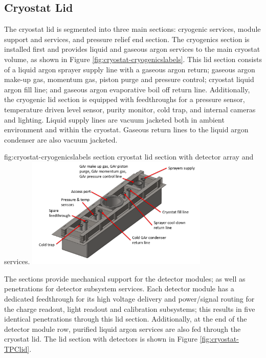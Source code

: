 \subsection{Cryostat Lid}
\label{sec:cryost-des-lid}
The  cryostat lid is segmented into three main sections: cryogenic services,  module support and services, and pressure relief end section.  The cryogenics section is installed first and provides liquid and gaseous argon services to the main cryostat volume, as shown in Figure \ref{fig:cryostat-cryogenicslabels}.  This lid section consists of a liquid argon sprayer supply line with a gaseous argon return; gaseous argon make-up gas, momentum gas, piston purge and pressure control; cryostat liquid argon fill line; and gaseous argon evaporative boil off return line.  Additionally, the cryogenic lid section is equipped with feedthroughs for a pressure sensor, temperature driven level sensor, purity monitor, cold trap, and internal cameras and lighting.  Liquid supply lines are vacuum jacketed both in ambient environment and within the cryostat.  Gaseous return lines to the liquid argon condenser are also vacuum jacketed. 

\begin{dunefigure}{fig:cryostat-cryogenicslabels}
{ section cryostat lid section with detector array and services.}
\includegraphics[width=0.65\textwidth]{graphics/cryostat/cryostat-cryogenicslidlabels.png}
\end{dunefigure}

The  sections provide mechanical support for the detector modules; as well as penetrations for detector subsystem services.   Each detector module has a dedicated feedthrough for its high voltage delivery and power/signal routing for the charge readout, light readout and calibration subsystems; this results in five identical penetrations through this lid section.  Additionally, at the end of the detector module row, purified liquid argon services are also fed through the cryostat lid.  The  lid section with detectors is shown in Figure \ref{fig:cryostat-TPClid}.


